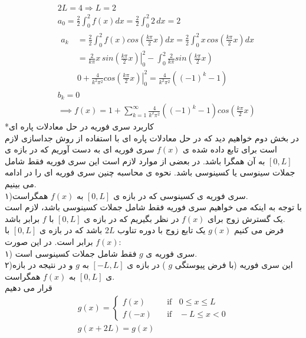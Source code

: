 \begin{equation*}
	\begin{aligned}
		{} &\
		2L=4\Rightarrow L=2
		\\ &\
		a_0=\frac{2}{2}\int_0^2{f(x)dx}=\frac{2}{2}\int_0^2{2 \, dx}=2
		\\ &\
		\begin{aligned}
			a_k {} &\
			= \frac{2}{2}\int_0^2{f(x)cos\left(\frac{k\pi}{2}x\right)dx}=
			\frac{2}{2}\int_0^2{x\,cos\left(\frac{k\pi}{2}x\right)dx}
			\\ &\
			=\left.{\frac{2}{k\pi}x \, sin\left(\frac{k\pi}{2}x\right)}\right |_0^2-\int_0^2{\frac{2}{k\pi} sin\left(\frac{k\pi}{2}x\right)}
			\\ &\
			0+\frac{4}{k^2\pi^2}\left.{cos\left(\frac{k\pi}{2}x\right)} \right |_0^2
			=\frac{4}{k^2\pi^2}\left( (-1)^k-1\right)
		\end{aligned}
	\\ &\
	b_k = 0
	\\ &\
	\implies f(x)=1+\sum_{k=1}^\infty{\frac{4}{k^2\pi^2}\left( (-1)^k-1\right)cos\left( \frac{k\pi}{2}x\right)}
	\end{aligned}
\end{equation*}
*کاربرد سری فوریه در حل معادلات پاره ای\\
در بخش دوم خواهیم دید که در حل معادلات پاره ای با استفاده از روش جداسازی لازم است برای تابع داده شده ی
$f(x)$
سری فوریه ای به دست آوریم که در بازه ی
$[0,L]$
به آن همگرا باشد. در  بعضی از موارد لازم است این سری فوریه فقط شامل جملات سینوسی یا کسینوسی باشد. نحوه ی محاسبه چنین سری فوریه ای را در ادامه می بینیم.\\
۱)سری فوریه ی کسینوسی که در بازه ی
$[0,L]$
به 
$f(x)$
همگراست.\\
با توجه به اینکه می خواهیم سری فوریه فقط شامل جملات کسینوسی باشد، لازم است یک گسترش زوج برای 
$f(x)$
در نظر بگیریم که در بازه ی
$[0,L]$
با 
$f$
برابر باشد.\\
فرض می کنیم 
$g(x)$
یک تابع زوج با دوره تناوب
$2L$
باشد که در بازه ی
$[0,L]$
با 
$f(x)$
برابر است. در این صورت:\\
۱) سری فوریه ی 
$g$
فقط شامل جملات کسینوسی است.\\
۲)این سری فوریه (با فرض پیوستگی
$g$
)
در بازه ی
$[-L,L]$
به
$g$
و در نتیجه در بازه ی
$[0,L]$
به
$f(x)$
همگراست.\\
قرار می دهیم
\begin{equation*}
	\begin{gathered}
		g(x) =
		\begin{cases}
			f(x)       & \quad \text{if }\;\; 0\le x\le L \\
			f(-x)  & \quad \text{if }\;\; -L\le x< 0
		\end{cases}\\
		g(x+2L)=g(x)
	\end{gathered}
\end{equation*}
